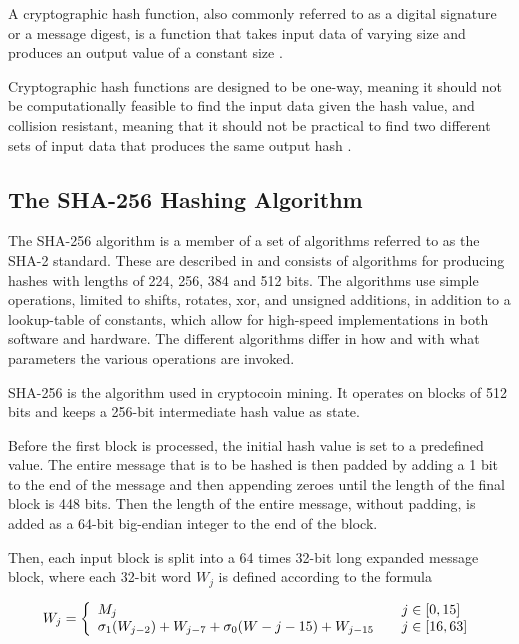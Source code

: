 A cryptographic hash function, also commonly referred to as a digital signature or
a message digest, is a function that takes input data of varying size and
produces an output value of a constant size \cite{hashing-overview}.

Cryptographic hash functions are designed to be one-way, meaning it should
not be computationally feasible to find the input data given the hash value,
and collision resistant, meaning that it should not be practical to find two
different sets of input data that produces the same output hash \cite{sha-spec}.

\subsection{The SHA-256 Hashing Algorithm}
\label{sec:hashing-algo}

The SHA-256 algorithm is a member of a set of algorithms referred to as the SHA-2 standard.
These are described in \cite{fips180-4} and consists of algorithms for producing hashes with lengths of 224, 256, 384 and 512 bits.
The algorithms use simple operations, limited to shifts, rotates, xor, and unsigned additions,
in addition to a lookup-table of constants, which allow for high-speed implementations in both
software and hardware. The different algorithms differ in how and with what parameters the various
operations are invoked.

SHA-256 is the algorithm used in cryptocoin mining. It operates on blocks of 512 bits
and keeps a 256-bit intermediate hash value as state.

Before the first block is processed, the initial hash value is set to a predefined
value. The entire message that is to be hashed is then padded by adding a 1 bit to
the end of the message and then appending zeroes until the length of the final block
is 448 bits. Then the length of the entire message, without padding, is added as a
64-bit big-endian integer to the end of the block.

Then, each input block is split into a 64 times 32-bit long expanded message block, where
each 32-bit word $W_j$ is defined according to the formula

\[ W_j = \left\{
	\begin{array}{l l}
		M_j & \quad j \in \left[0, 15\right]\\
		\sigma_1(W_{j - 2}) + W_{j - 7} + \sigma_0(W-{j - 15}) + W_{j - 15} & \quad j \in \left[16, 63\right]
	\end{array}
\right.\]

